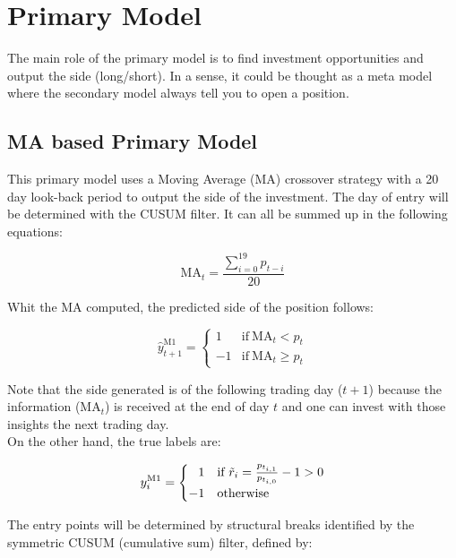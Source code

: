 \documentclass[a4paper]{article}
\begin{document}
\section{Primary Model}
\label{sec:primaryModel}
The main role of the primary model is to find investment opportunities 
and output the side (long/short). In a sense, it could be thought as a 
meta model where the secondary model always tell you to open a 
position.

\subsection{MA based Primary Model}
\label{sec:MAPrimaryModel}
This primary model uses a Moving Average (MA) crossover strategy with 
a 20 day look-back period to output the side of the investment. The 
day of entry will be determined with the CUSUM filter. It can all be 
summed up in the following equations:

\begin{equation}
\label{eqn:MA}
	\text{MA}_t = \frac{\sum_{i = 0}^{19} p_{t-i}}{20}
\end{equation}

Whit the MA computed, the predicted side of the position follows:

\begin{equation}
\label{eqn:MAcrossover}
	\hat{y}_{t+1}^{\text{M1}} =
	\begin{cases}
		1  & \text{if}\ \text{MA}_t < p_t\\
		-1 & \text{if}\ \text{MA}_t \geq p_t
	\end{cases}
\end{equation}

Note that the side generated is of the following trading day ($t+1$) 
because the information ($\text{MA}_t$) is received at the end of day 
$t$ and one can invest with those insights the next trading day.\\

On the other hand, the true labels are:

\begin{equation}
	y_{i}^{\text{M1}} = 
	\begin{cases}
	\hfill 1 & \text{if}\ 
	\tilde{r}_i = \frac{p_{t_{i,1}}}{p_{t_{i,0}}} -1 > 0\\
	\hfill -1 & \text{otherwise}	
	\end{cases}
\end{equation}

The entry points will be determined by structural breaks identified by 
the symmetric CUSUM (cumulative sum) filter, defined by:
\end{document}

